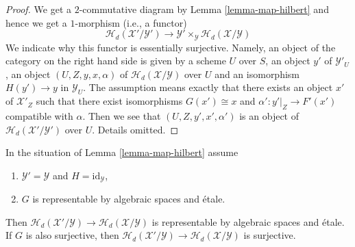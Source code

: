 \begin{proof}
We get a $2$-commutative diagram by
Lemma \ref{lemma-map-hilbert}
and hence we get a $1$-morphism (i.e., a functor)
$$
\mathcal{H}_d(\mathcal{X}'/\mathcal{Y}')
\longrightarrow
\mathcal{Y}' \times_\mathcal{Y} \mathcal{H}_d(\mathcal{X}/\mathcal{Y})
$$
We indicate why this functor is essentially surjective. Namely, an object
of the category on the right hand side is given by a scheme $U$ over $S$,
an object $y'$ of $\mathcal{Y}'_U$, an object $(U, Z, y, x, \alpha)$
of $\mathcal{H}_d(\mathcal{X}/\mathcal{Y})$ over $U$ and an isomorphism
$H(y') \to y$ in $\mathcal{Y}_U$. The assumption means exactly that
there exists an object $x'$ of $\mathcal{X}'_Z$ such that there exist
isomorphisms $G(x') \cong x$ and $\alpha' : y'|_Z \to F'(x')$ compatible
with $\alpha$. Then we see that $(U, Z, y', x', \alpha')$ is an
object of $\mathcal{H}_d(\mathcal{X}'/\mathcal{Y}')$ over $U$.
Details omitted.
\end{proof}

\begin{lemma}
\label{lemma-etale-covering-hilbert}
In the situation of
Lemma \ref{lemma-map-hilbert}
assume
\begin{enumerate}
\item $\mathcal{Y}' = \mathcal{Y}$ and $H = \text{id}_\mathcal{Y}$,
\item $G$ is representable by algebraic spaces and \'etale.
\end{enumerate}
Then $\mathcal{H}_d(\mathcal{X}'/\mathcal{Y}) \to
\mathcal{H}_d(\mathcal{X}/\mathcal{Y})$ is representable by
algebraic spaces and \'etale.
If $G$ is also surjective, then
$\mathcal{H}_d(\mathcal{X}'/\mathcal{Y}) \to
\mathcal{H}_d(\mathcal{X}/\mathcal{Y})$ is surjective.
\end{lemma}

